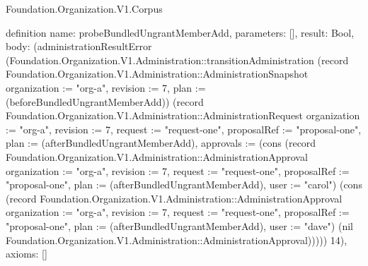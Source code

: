 \begin{lexlean}{Foundation.Organization.V1.Corpus}
\begin{semanticmodule}
definition{
  name: probeBundledUngrantMemberAdd,
  parameters: [],
  result: Bool,
  body: (administrationResultError (Foundation.Organization.V1.Administration::transitionAdministration (record Foundation.Organization.V1.Administration::AdministrationSnapshot {organization := "org-a", revision := 7, plan := (beforeBundledUngrantMemberAdd)}) (record Foundation.Organization.V1.Administration::AdministrationRequest {organization := "org-a", revision := 7, request := "request-one", proposalRef := "proposal-one", plan := (afterBundledUngrantMemberAdd), approvals := (cons (record Foundation.Organization.V1.Administration::AdministrationApproval {organization := "org-a", revision := 7, request := "request-one", proposalRef := "proposal-one", plan := (afterBundledUngrantMemberAdd), user := "carol"}) (cons (record Foundation.Organization.V1.Administration::AdministrationApproval {organization := "org-a", revision := 7, request := "request-one", proposalRef := "proposal-one", plan := (afterBundledUngrantMemberAdd), user := "dave"}) (nil Foundation.Organization.V1.Administration::AdministrationApproval)))})) 14),
  axioms: []
}


\end{semanticmodule}
\end{lexlean}
